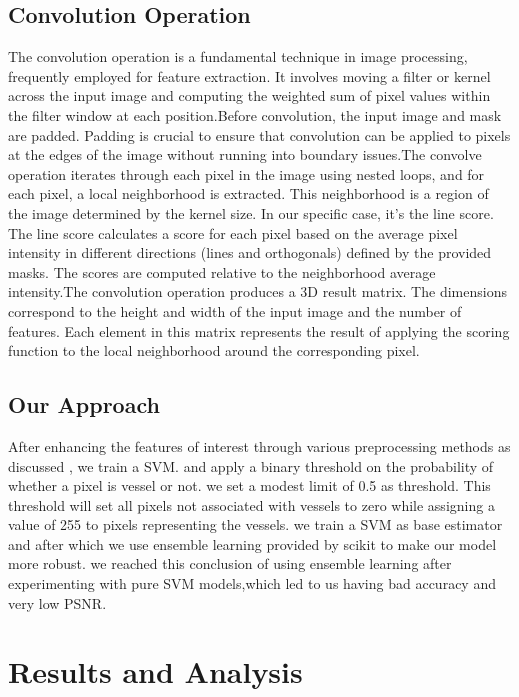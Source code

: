 \documentclass{article}
\begin{document}
\subsection{Convolution  Operation}
The convolution operation is a fundamental technique in image processing, frequently employed for feature extraction. It involves moving a filter or kernel across the input image and computing the weighted sum of pixel values within the filter window at each position.Before convolution, the input image and mask are padded. Padding is crucial to ensure that convolution can be applied to pixels at the edges of the image without running into boundary issues.The  convolve operation iterates through each pixel in the image using nested loops, and for each pixel, a local neighborhood is extracted. This neighborhood is a region of the image determined by the kernel size. In our specific case, it's the line score.
The line score calculates a score for each pixel based on the average pixel intensity in different directions (lines and orthogonals) defined by the provided masks. The scores are computed relative to the neighborhood average intensity.The convolution operation produces a 3D result matrix. The dimensions correspond to the height and width of the input image and the number of features. Each element in this matrix represents the result of applying the scoring function to the local neighborhood around the corresponding pixel.
\subsection{Our Approach}
 After enhancing the features of interest through various preprocessing methods as discussed , we train a SVM. and  apply a binary threshold on the probability of whether a pixel is vessel or not. we set a modest limit of 0.5 as threshold. This threshold will set all pixels not associated with vessels to zero while assigning a value of 255 to pixels representing the vessels. we train a SVM as base estimator and after which we use ensemble learning provided by scikit to make our model more robust. we reached this conclusion of using ensemble learning after experimenting with pure SVM models,which led to us having bad accuracy and very low PSNR.

\section{Results and Analysis}
\end{document}
